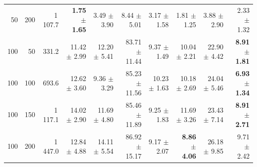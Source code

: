 \begin{tabular}{rrrrrrrrrr}
50 & 200 & 1\,107.7 & \textbf{1.75 $\pm$ 1.65} & 3.49 $\pm$ 3.90 & 8.44 $\pm$ 5.01 & 3.17 $\pm$ 1.58 & 1.81 $\pm$ 1.25 & 3.88 $\pm$ 2.90 & 2.33 $\pm$ 1.32 \\
100 & 50 & 331.2 & 11.42 $\pm$ 2.99 & 12.20 $\pm$ 5.41 & 83.71 $\pm$ 11.44 & 9.37 $\pm$ 1.49 & 10.04 $\pm$ 2.21 & 22.90 $\pm$ 4.42 & \textbf{8.91 $\pm$ 1.81} \\
100 & 100 & 693.6 & 12.62 $\pm$ 3.60 & 9.36 $\pm$ 3.29 & 85.23 $\pm$ 11.56 & 10.23 $\pm$ 1.63 & 10.18 $\pm$ 2.69 & 24.04 $\pm$ 5.46 & \textbf{6.93 $\pm$ 1.34} \\
100 & 150 & 1\,117.1 & 14.02 $\pm$ 2.90 & 11.69 $\pm$ 4.80 & 85.46 $\pm$ 11.89 & 9.25 $\pm$ 1.83 & 11.69 $\pm$ 3.26 & 23.43 $\pm$ 7.14 & \textbf{8.91 $\pm$ 2.71} \\
100 & 200 & 1\,447.0 & 12.84 $\pm$ 4.88 & 14.11 $\pm$ 5.54 & 86.92 $\pm$ 15.17 & 9.17 $\pm$ 2.07 & \textbf{8.86 $\pm$ 4.06} & 26.18 $\pm$ 9.85 & 9.71 $\pm$ 2.42 \\
\bottomrule
\end{tabular}
